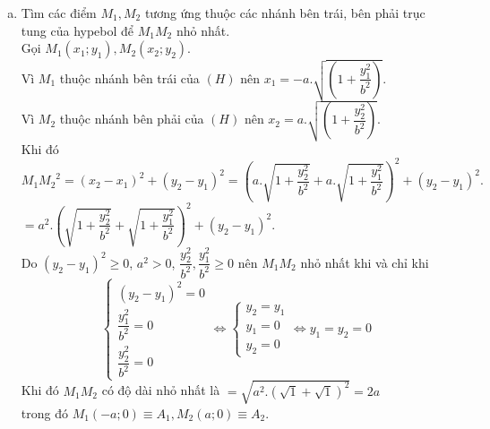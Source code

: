 \begin{bt}
{\begin{enumerate}[a)]
(vì $M(x;y)$ thuộc nhánh bên phải trục tung của $(H)$ nên $x>0$.)\\
Hơn nữa, ta có $\sqrt{\left( 1+ \dfrac{y^{2}}{b^{2}} \right)} \geq 1$ nên $a.\sqrt{\left( 1+ \dfrac{y^{2}}{b^{2}} \right)} \geq a$ hay $x \geq a$.\\
\item Tìm các điểm $M_{1}, M_{2}$ tương ứng thuộc các nhánh bên trái, bên phải trục tung của hypebol để $M_{1} M_{2}$ nhỏ nhất.\\
Gọi $M_1(x_1;y_1), M_2(x_2;y_2)$.\\
Vì $M_1$ thuộc nhánh bên trái của $(H)$ nên $x_1=-a.\sqrt{\left( 1+ \dfrac{y_1^{2}}{b^{2}} \right)}.$\\
Vì $M_2$ thuộc nhánh bên phải của $(H)$ nên $x_2=a.\sqrt{\left( 1+ \dfrac{y_2^{2}}{b^{2}} \right)}.$\\
Khi đó ${M_1M_2}^2= (x_2-x_1)^2+(y_2-y_1)^2=\left( a.\sqrt{1+ \dfrac{y_2^{2}}{b^{2}}} + a.\sqrt{1+ \dfrac{y_1^{2}}{b^{2}}}\right)^2+(y_2-y_1)^2.$\\
$=a^2.\left( \sqrt{1+ \dfrac{y_2^{2}}{b^{2}}} + \sqrt{1+ \dfrac{y_1^{2}}{b^{2}}}\right)^2+(y_2-y_1)^2$.\\
Do $(y_2-y_1)^2 \geq 0$, $a^2>0$, $\dfrac{y_2^{2}}{b^{2}}, \dfrac{y_1^{2}}{b^{2}} \geq 0$ nên ${M_1M_2}$ nhỏ nhất khi và chỉ khi \[\left\{ {\begin{array}{*{20}{c}}
  {{{({y_2} - {y_1})}^2} = 0} \\
  {\dfrac{{y_1^2}}{{{b^2}}} = 0} \\
  {\dfrac{{y_2^2}}{{{b^2}}} = 0}
\end{array}} \right. \Leftrightarrow \left\{ {\begin{array}{*{20}{c}}
  {{y_2} = {y_1}} \\
  {{y_1} = 0} \\
  {{y_2} = 0}
\end{array}} \right. \Leftrightarrow {y_1} = {y_2} = 0\]
Khi đó $M_1M_2$ có độ dài nhỏ nhất là $=\sqrt{a^2.\left( \sqrt{1} + \sqrt{1}\right)^2}=2a$\\
trong đó $M_1(-a;0) \equiv A_1 , M_2(a;0) \equiv A_2.$
\end{enumerate}
}
\end{bt}

